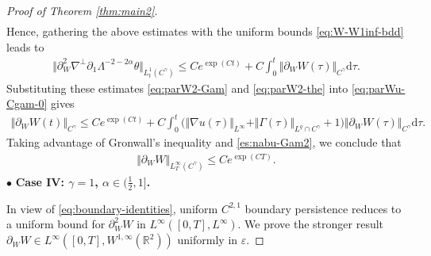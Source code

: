 \documentclass[reqno,11pt,a4paper]{amsart}
\newcommand{\R}{\ensuremath{\mathbb{R}}}
\newcommand{\dd}{\mathrm{d}}
\def \p {\partial}
\begin{document}
\begin{proof}[Proof of Theorem \ref{thm:main2}]
\begin{align*}
\end{align*}
Hence, gathering the above estimates with the uniform bounds \eqref{eq:W-W1inf-bdd} leads to 
\begin{align}\label{eq:parW2-the}
  \big\Vert \partial_W^2 \nabla^{\perp}\p_1\Lambda^{-2-2\alpha} \theta \big\Vert _{L^1_t(C^\gamma)} 
  \leq C e^{\exp(Ct)}  + C \int_0^t \Vert \partial_W W(\tau)\Vert _{C^\gamma}\dd \tau.
\end{align}
Substituting these estimates \eqref{eq:parW2-Gam} and \eqref{eq:parW2-the} into \eqref{eq:parWu-Cgam-0} gives
\begin{align*}
  \Vert  \p_WW(t)\Vert _{C^\gamma} \leq C e^{\exp(Ct)}
  + C \int_0^t \big(\Vert \nabla u(\tau)\Vert _{L^\infty} 
  + \Vert \Gamma(\tau)\Vert _{L^q\cap C^\gamma}+ 1\big) \Vert  \p_W W(\tau)\Vert _{C^\gamma} \dd\tau .
\end{align*}
Taking advantage of Gronwall's inequality and \eqref{es:nabu-Gam2}, we conclude that
\begin{align}\label{es:pWW-Cgam}
  \Vert  \p_W W\Vert _{L^\infty_T(C^\gamma)}\leq C e^{\exp (CT)}.
\end{align}
\vskip1mm
$\bullet$ \textbf{Case IV: $\gamma=1$, $\alpha\in(\frac{1}{2},1]$.} 
\vskip1mm

In view of \eqref{eq:boundary-identities}, uniform
$C^{2,1}$ boundary persistence reduces to a uniform bound
for $\partial_W^2W$ in $L^\infty([0,T],L^\infty)$.
We prove the stronger result 
$\p_W W\in L^\infty([0,T], W^{1,\infty}(\R^2))$ uniformly in 
$\varepsilon$.


\end{proof}
\end{document}
